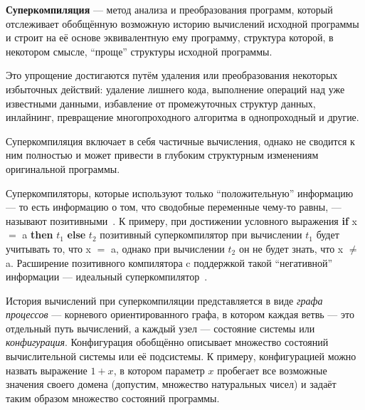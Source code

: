 {\bf Суперкомпиляция} --- метод анализа и преобразования программ,
который отслеживает обобщённую возможную историю вычислений исходной программы и строит
на её основе эквивалентную ему программу, структура которой, в некотором смысле, ``проще''
структуры исходной программы\cite{turchinSC}. %

Это упрощение достигаются путём удаления или преобразования
некоторых избыточных действий: удаление лишнего кода, выполнение операций над
уже известными данными, избавление от промежуточных структур данных, инлайнинг,
превращение многопроходного алгоритма в однопроходный и другие.

Суперкомпиляция включает в себя частичные вычисления, однако не сводится к ним полностью
и может привести в глубоким структурным изменениям оригинальной программы.

Суперкомпиляторы, которые используют только ``положительную'' информацию
--- то есть информацию о том, что сводобные переменные чему-то равны, ---
называют позитивными~\cite{scPos}.
К примеру, при достижении условного выражения {\bf if} x $=$ a {\bf then} $t_1$ {\bf else} $t_2$
позитивный суперкомпилятор при вычислении $t_1$ будет учитывать то, что x $=$ a,
однако при вычислении $t_2$ он не будет знать, что x $\neq$ a.
Расширение позитивного компилятора c поддержкой такой ``негативной'' информации --- идеальный
суперкомпилятор~\cite{scPerf}.


История вычислений при суперкомпиляции представляется в виде \emph{графа процессов} --- корневого ориентированного графа,
в котором каждая ветвь --- это отдельный путь вычислений, а каждый узел --- состояние системы или \emph{конфигурация}.
Конфигурация обобщённо описывает множество состояний вычислительной системы или её подсистемы.
К примеру, конфигурацией можно назвать выражение $1 + x$, в котором параметр $x$ пробегает
все возможные значения своего домена (допустим, множество натуральных чисел) и задаёт
таким образом множество состояний программы. 

